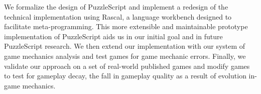 



We formalize the design of PuzzleScript and implement a redesign of the technical implementation using Rascal, a language workbench designed to facilitate meta-programming. This more extensible and maintainable prototype implementation of PuzzleScript aids us in our initial goal and in future PuzzleScript research. We then extend our implementation with our system of game mechanics analysis and test games for game mechanic errors. Finally, we validate our approach on a set of real-world published games and modify games to test for gameplay decay, the fall in gameplay quality as a result of evolution in-game mechanics.